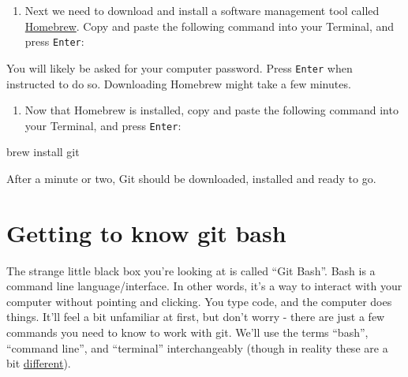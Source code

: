 \documentclass[
]{book}
\newenvironment{Shaded}{\begin{snugshade}}{\end{snugshade}}
\newcommand{\NormalTok}[1]{#1}
\newcommand{\SpecialCharTok}[1]{\textcolor[rgb]{0.00,0.00,0.00}{#1}}
\newcommand{\StringTok}[1]{\textcolor[rgb]{0.31,0.60,0.02}{#1}}
\providecommand{\tightlist}{%
  \setlength{\itemsep}{0pt}\setlength{\parskip}{0pt}}
\begin{document}
\begin{enumerate}
\def\labelenumi{\arabic{enumi}.}
\setcounter{enumi}{1}
\tightlist
\item
  Next we need to download and install a software management tool called \href{brew.sh}{Homebrew}. Copy and paste the following command into your Terminal, and press \texttt{Enter}:
\end{enumerate}

\begin{Shaded}
\end{Shaded}

You will likely be asked for your computer password. Press \texttt{Enter} when instructed to do so. Downloading Homebrew might take a few minutes.

\begin{enumerate}
\def\labelenumi{\arabic{enumi}.}
\setcounter{enumi}{2}
\tightlist
\item
  Now that Homebrew is installed, copy and paste the following command into your Terminal, and press \texttt{Enter}:
\end{enumerate}

\begin{Shaded}
\begin{Highlighting}[]
\NormalTok{brew install git}
\end{Highlighting}
\end{Shaded}

After a minute or two, Git should be downloaded, installed and ready to go.

\hypertarget{getting-to-know-git-bash}{%
\section*{Getting to know git bash}\label{getting-to-know-git-bash}}

The strange little black box you're looking at is called ``Git Bash''. Bash is a command line language/interface. In other words, it's a way to interact with your computer without pointing and clicking. You type code, and the computer does things. It'll feel a bit unfamiliar at first, but don't worry - there are just a few commands you need to know to work with git. We'll use the terms ``bash'', ``command line'', and ``terminal'' interchangeably (though in reality these are a bit \href{https://superuser.com/questions/880344/what-is-the-difference-between-terminal-and-bash}{different}).
\end{document}
